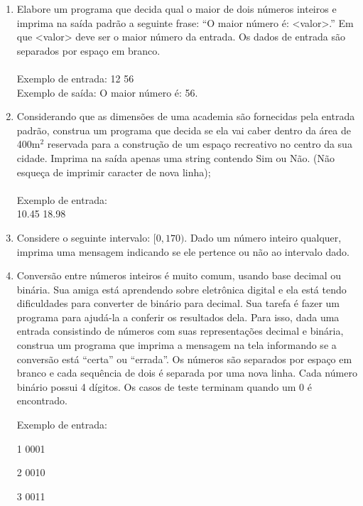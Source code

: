 \begin{enumerate}
  \item Elabore um programa que decida qual o maior de dois números inteiros e imprima na saída padrão a seguinte     
  frase: ``O maior número é: <valor>.'' Em que <valor> deve ser o maior número da entrada. Os dados de entrada são separados por espaço em branco.\\
  \\Exemplo de entrada: 12 56
  \\Exemplo de saída: O maior número é: 56.
  
  
  \item Considerando que as dimensões de uma academia são fornecidas pela entrada padrão, construa um programa que        
  decida se ela vai caber dentro da área de 400m$^{2}$ reservada para a construção de um espaço recreativo no       
  centro da sua cidade. Imprima na saída apenas uma string contendo Sim ou Não. (Não esqueça de imprimir caracter de nova linha);\\
  \\ Exemplo de entrada: \\10.45 18.98
  
  \item Considere o seguinte intervalo: $[0, 170)$. Dado um número inteiro qualquer, imprima uma mensagem 
  indicando se ele pertence ou não ao intervalo dado.
  
  \item Conversão entre números inteiros é muito comum, usando base decimal ou binária. Sua amiga está aprendendo sobre eletrônica digital e ela está tendo dificuldades para converter de binário para decimal. Sua tarefa é fazer um programa para ajudá-la a conferir os resultados dela. Para isso, dada uma entrada consistindo de números com suas representações decimal e binária, construa um programa que imprima a mensagem na tela informando se a conversão está ``certa'' ou ``errada''. Os números são separados por espaço em branco e cada sequência de dois é separada por uma nova linha. Cada número binário possui 4 dígitos. Os casos de teste terminam quando um 0 é encontrado.\\
  
  
    \begin{minipage}{.45\textwidth}
      \centering

Exemplo de entrada: 

  1 0001
  
  2 0010
  
  3 0011
  

\end{minipage}
\end{enumerate}
